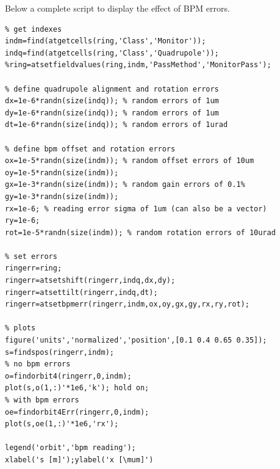 Below a complete script to display the effect of BPM errors. 
\begin{lstlisting}
% get indexes
indm=find(atgetcells(ring,'Class','Monitor'));
indq=find(atgetcells(ring,'Class','Quadrupole'));
%ring=atsetfieldvalues(ring,indm,'PassMethod','MonitorPass');

% define quadrupole alignment and rotation errors
dx=1e-6*randn(size(indq)); % random errors of 1um
dy=1e-6*randn(size(indq)); % random errors of 1um
dt=1e-6*randn(size(indq)); % random errors of 1urad

% define bpm offset and rotation errors
ox=1e-5*randn(size(indm)); % random offset errors of 10um
oy=1e-5*randn(size(indm)); 
gx=1e-3*randn(size(indm)); % random gain errors of 0.1%
gy=1e-3*randn(size(indm));  
rx=1e-6; % reading error sigma of 1um (can also be a vector)
ry=1e-6; 
rot=1e-5*randn(size(indm)); % random rotation errors of 10urad

% set errors
ringerr=ring;
ringerr=atsetshift(ringerr,indq,dx,dy);
ringerr=atsettilt(ringerr,indq,dt);
ringerr=atsetbpmerr(ringerr,indm,ox,oy,gx,gy,rx,ry,rot);

% plots
figure('units','normalized','position',[0.1 0.4 0.65 0.35]);
s=findspos(ringerr,indm);
% no bpm errors
o=findorbit4(ringerr,0,indm);
plot(s,o(1,:)'*1e6,'k'); hold on;
% with bpm errors
oe=findorbit4Err(ringerr,0,indm);
plot(s,oe(1,:)'*1e6,'rx');

legend('orbit','bpm reading');
xlabel('s [m]');ylabel('x [\mum]')

\end{lstlisting}


